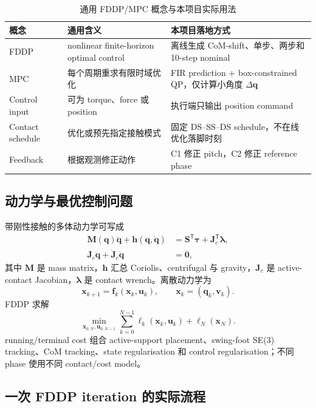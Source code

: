 \documentclass[UTF8,11pt,a4paper]{ctexart}
\begin{document}
\begin{table}[htbp]
\centering
\caption{通用 FDDP/MPC 概念与本项目实际用法}
\begin{tabularx}{\linewidth}{@{}p{3.0cm}X X@{}}
\toprule
概念 & 通用含义 & 本项目落地方式 \\
\midrule
FDDP & nonlinear finite-horizon optimal control & 离线生成 CoM-shift、单步、两步和 10-step nominal \\
MPC & 每个周期重求有限时域优化 & FIR prediction + box-constrained QP，仅计算小角度 $\Delta\bm q$ \\
Control input & 可为 torque、force 或 position & 执行端只输出 position command \\
Contact schedule & 优化或预先指定接触模式 & 固定 DS--SS--DS schedule，不在线优化落脚时刻 \\
Feedback & 根据观测修正动作 & C1 修正 pitch，C2 修正 reference phase \\
\bottomrule
\end{tabularx}
\end{table}

\subsection{动力学与最优控制问题}

带刚性接触的多体动力学可写成
\begin{align}
 \bm M(\bm q)\ddot{\bm q}+\bm h(\bm q,\dot{\bm q})
 &=\bm S^{\mathsf T}\bm\tau+\bm J_c^{\mathsf T}\bm\lambda, \\
 \bm J_c\ddot{\bm q}+\dot{\bm J}_c\dot{\bm q}&=\bm 0,
\end{align}
其中 $\bm M$ 是 mass matrix，$\bm h$ 汇总 Coriolis、centrifugal 与 gravity，$\bm J_c$ 是 active-contact Jacobian，$\bm\lambda$ 是 contact wrench。离散动力学为
\begin{equation}
 \bm x_{k+1}=\bm f_k(\bm x_k,\bm u_k),\qquad
 \bm x_k=(\bm q_k,\bm v_k).
\end{equation}
FDDP 求解
\begin{equation}
 \min_{\bm x_{0:N},\bm u_{0:N-1}}
 \sum_{k=0}^{N-1}\ell_k(\bm x_k,\bm u_k)+\ell_N(\bm x_N).
 \label{eq:ocp}
\end{equation}
running/terminal cost 组合 active-support placement、swing-foot SE(3) tracking、CoM tracking、state regularisation 和 control regularisation；不同 phase 使用不同 contact/cost model。

\subsection{一次 FDDP iteration 的实际流程}
\end{document}
